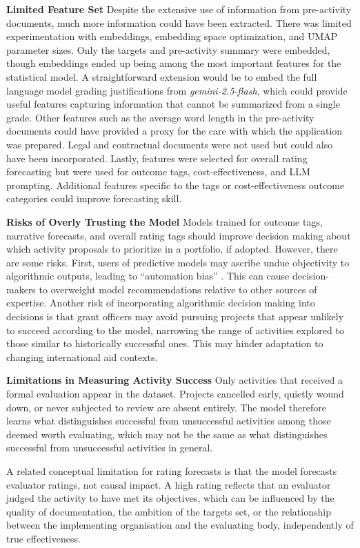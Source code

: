 \documentclass[12pt,a4paper]{article}
\let\citep\parencite
\begin{document}
\textbf{Limited Feature Set}
Despite the extensive use of information from pre-activity documents, much more information could have been extracted. There was limited experimentation with embeddings, embedding space optimization, and UMAP parameter sizes. Only the targets and pre-activity summary were embedded, though embeddings ended up being among the most important features for the statistical model. A straightforward extension would be to embed the full language model grading justifications from \emph{gemini-2.5-flash}, which could provide useful features capturing information that cannot be summarized from a single grade. Other features such as the average word length in the pre-activity documents could have provided a proxy for the care with which the application was prepared. Legal and contractual documents were not used but could also have been incorporated. Lastly, features were selected for overall rating forecasting but were used for outcome tags, cost-effectiveness, and LLM prompting. Additional features specific to the tags or cost-effectiveness outcome categories could improve forecasting skill.

\textbf{Risks of Overly Trusting the Model}
Models trained for outcome tags, narrative forecasts, and overall rating tags should improve decision making about which activity proposals to prioritize in a portfolio, if adopted. However, there are some risks. First, users of predictive models may ascribe undue objectivity to algorithmic outputs, leading to ``automation bias'' \citep{loggAlgorithmAppreciationPeople2019}. This can cause decision-makers to overweight model recommendations relative to other sources of expertise. Another risk of incorporating algorithmic decision making into decisions is that grant officers may avoid pursuing projects that appear unlikely to succeed according to the model, narrowing the range of activities explored to those similar to historically successful ones. This may hinder adaptation to changing international aid contexts.

\textbf{Limitations in Measuring Activity Success}
Only activities that received a formal evaluation appear in the dataset. Projects cancelled early, quietly wound down, or never subjected to review are absent entirely. The model therefore learns what distinguishes successful from unsuccessful activities among those deemed worth evaluating, which may not be the same as what distinguishes successful from unsuccessful activities in general.

A related conceptual limitation for rating forecasts is that the model forecasts evaluator ratings, not causal impact. A high rating reflects that an evaluator judged the activity to have met its objectives, which can be influenced by the quality of documentation, the ambition of the targets set, or the relationship between the implementing organisation and the evaluating body, independently of true effectiveness. 
\end{document}
